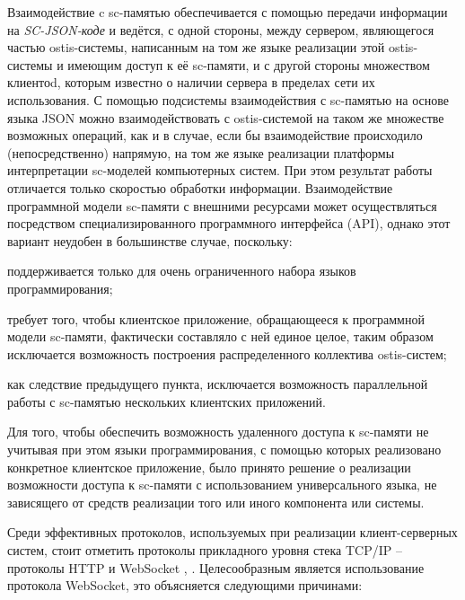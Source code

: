 Взаимодействие c sc-памятью обеспечивается с помощью передачи информации на \textit{SC-JSON-коде} и ведётся, с одной стороны, между сервером, являющегося частью ostis-системы, написанным на том же языке реализации этой ostis-системы и имеющим доступ к её sc-памяти, и с другой стороны множеством клиентоd, которым известно о наличии сервера в пределах сети их использования. С помощью подсистемы взаимодействия с sc-памятью на основе языка JSON можно взаимодействовать с ostis-системой на таком же множестве возможных операций, как и в случае, если бы взаимодействие происходило (непосредственно) напрямую, на том же языке реализации платформы интерпретации sc-моделей компьютерных систем. При этом результат работы отличается только скоростью обработки информации.
Взаимодействие программной модели sc-памяти с внешними ресурсами может осуществляться посредством специализированного программного интерфейса (API), однако этот вариант неудобен в большинстве случае, поскольку:
    \begin{textitemize}
        \item поддерживается только для очень ограниченного набора языков программирования;
        \item требует того, чтобы клиентское приложение, обращающееся к программной модели sc-памяти, фактически составляло с ней единое целое, таким образом исключается возможность построения распределенного коллектива ostis-систем;
        \item как следствие предыдущего пункта, исключается возможность параллельной работы с sc-памятью нескольких клиентских приложений.
   \end{textitemize}
Для того, чтобы обеспечить возможность удаленного доступа к sc-памяти не учитывая при этом языки программирования, с помощью которых реализовано конкретное клиентское приложение, было принято решение о реализации возможности доступа к sc-памяти с использованием универсального языка, не зависящего от средств реализации того или иного компонента или системы.

Среди эффективных протоколов, используемых при реализации клиент-серверных систем, стоит отметить протоколы прикладного уровня стека TCP/IP -- протоколы HTTP и WebSocket \cite{webockets_overview}, \cite{naik2020study}. Целесообразным является использование протокола WebSocket, это объясняется следующими причинами:

